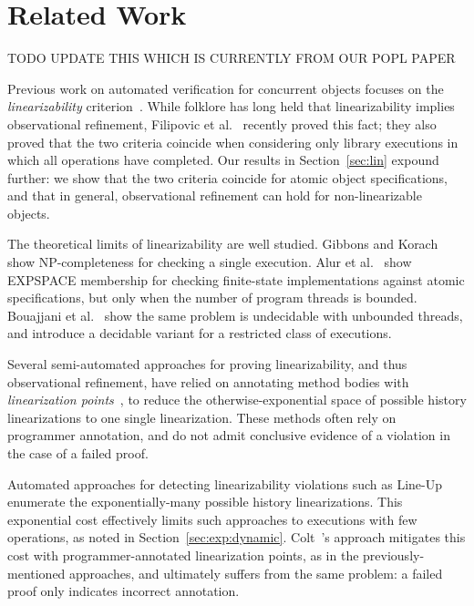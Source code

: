 \section{Related Work}
\label{sec:related}

TODO UPDATE THIS WHICH IS CURRENTLY FROM OUR POPL PAPER

Previous work on automated verification for concurrent objects focuses on the
\emph{linearizability} criterion~\citep{journals/toplas/HerlihyW90}. While
folklore has long held that linearizability implies observational refinement,
Filipovic et al.~\cite{journals/tcs/FilipovicORY10} recently proved this fact;
they also proved that the two criteria coincide when considering only library
executions in which all operations have completed. Our results in
Section~\ref{sec:lin} expound further: we show that the two criteria coincide
for atomic object specifications, and that in general, observational refinement
can hold for non-linearizable objects.

The theoretical limits of linearizability are well studied. Gibbons
and Korach~\cite{journals/siamcomp/GibbonsK97} show NP-completeness for
checking a single execution. Alur et al.~\cite{journals/iandc/AlurMP00} show
EXPSPACE membership for checking finite-state implementations against atomic
specifications, but only when the number of program threads is bounded.
Bouajjani et al.~\cite{conf/esop/BouajjaniEEH13} show the same problem is
undecidable with unbounded threads, and introduce a decidable variant for a
restricted class of executions.


Several semi-automated approaches for proving linearizability, and thus
observational refinement, have relied on annotating method bodies with
\emph{linearization points}~\cite{conf/cav/AmitRRSY07, conf/fm/LiuCLS09,
conf/podc/OHearnRVYY10, conf/cav/Vafeiadis10, conf/icse/Zhang11a}, to reduce the otherwise-exponential
space of possible history linearizations to one single linearization. These
methods often rely on programmer annotation, and do not admit conclusive
evidence of a violation in the case of a failed proof.

Automated approaches for detecting linearizability violations such as
Line-Up~\cite{conf/pldi/BurckhardtDMT10} enumerate the exponentially-many
possible history linearizations. This exponential cost effectively limits such
approaches to executions with few operations, as noted in
Section~\ref{sec:exp:dynamic}. Colt~\cite{conf/oopsla/ShachamBASVY11}'s
approach mitigates this cost with programmer-annotated linearization points, as
in the previously-mentioned approaches, and ultimately suffers from the same
problem: a failed proof only indicates incorrect annotation.


~\cite{conf/popl/BouajjaniEEH15}